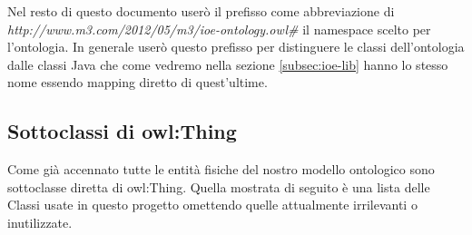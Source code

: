 Nel resto di questo documento userò il prefisso  come abbreviazione di \emph{http://www.m3.com/2012/05/m3/ioe-ontology.owl\#} il namespace scelto per l'ontologia. In generale userò questo prefisso per distinguere le classi dell'ontologia dalle classi Java che come vedremo nella sezione \ref{subsec:ioe-lib} hanno lo stesso nome essendo mapping diretto di quest'ultime.

\subsection{Sottoclassi di owl:Thing}\label{subsec:thing}

Come già accennato tutte le entità fisiche del nostro modello ontologico sono sottoclasse diretta di owl:Thing. Quella mostrata di seguito è una lista delle Classi usate in questo progetto omettendo quelle attualmente irrilevanti o inutilizzate.

